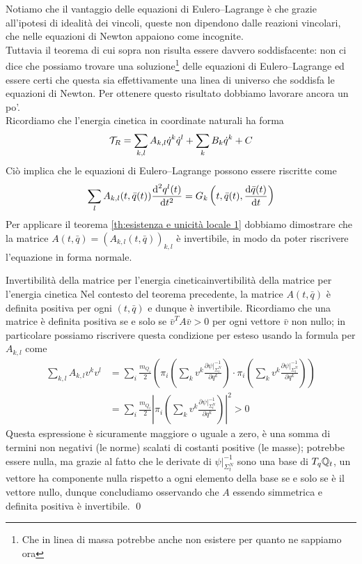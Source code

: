 \documentclass[openany]{book}
\begin{document}
Notiamo che il vantaggio delle equazioni di Eulero--Lagrange è che grazie all'ipotesi di idealità dei vincoli, queste non dipendono dalle reazioni vincolari, che nelle equazioni di Newton appaiono come incognite.\\
Tuttavia il teorema di cui sopra non risulta essere davvero soddisfacente: non ci dice che possiamo trovare una soluzione\footnote{Che in linea di massa potrebbe anche non esistere per quanto ne sappiamo ora} delle equazioni di Eulero--Lagrange ed essere certi che questa sia effettivamente una linea di universo che soddisfa le equazioni di Newton. Per ottenere questo risultato dobbiamo lavorare ancora un po'.\\
Ricordiamo che l'energia cinetica in coordinate naturali ha forma 
\[ \mathcal{T}_R = \sum_{k,l}A_{k,l}\dot q^k \dot q^l + \sum_k B_k \dot q^k + C  \]
Ciò implica che le equazioni di Eulero--Lagrange possono essere riscritte come 
\[ \sum_l A_{k,l}(t,\bar q(t))\frac{\text{d}^2 q^l(t)}{\text{d} t^2} = G_k\left(t, \bar q(t), \frac{\text{d}\bar q(t)}{\text{d} t}\right) \]
Per applicare il teorema \cref{th:esistenza e unicità locale 1} dobbiamo dimostrare che la matrice $A(t,\bar q) = (A_{k,l}(t,\bar q))_{k,l}$ è invertibile, in modo da poter riscrivere l'equazione in forma normale.

\begin{theorem}{Invertibilità della matrice per l'energia cinetica}{invertibilità della matrice per l'energia cinetica}
    Nel contesto del teorema precedente, la matrice $A(t,\bar q)$ è definita positiva per ogni $(t,\bar q)$ e dunque è invertibile.
    \proof 
    Ricordiamo che una matrice è definita positiva se e solo se $\bar v^T A \bar v > 0$ per ogni vettore $\bar v$  non nullo; in particolare possiamo riscrivere questa condizione per esteso usando la formula per $A_{k,l}$ come 
    \begin{align*} \sum_{k,l} A_{k,l} v^k v^l & = \sum_i \frac{m_{Q_i}}{2} \left( \pi_i\left( \sum_k v^k \frac{\partial \psi|_{\Sigma_t^N}^{-1}}{\partial q^k} \right) \cdot \pi_i\left( \sum_k v^k \frac{\partial \psi|_{\Sigma_t^N}^{-1}}{\partial q^k} \right) \right) \\ & = \sum_i \frac{m_{Q_i}}{2} \left| \pi_i\left( \sum_k v^k \frac{\partial \psi|_{\Sigma_t^N}^{-1}}{\partial q^k} \right) \right|^2 > 0 \end{align*}
    Questa espressione è sicuramente maggiore o uguale a zero, è una somma di termini non negativi (le norme) scalati di costanti positive (le masse); potrebbe essere nulla, ma grazie al fatto che le derivate di $\psi|_{\Sigma_t^N}^{-1}$ sono una base di $T_q\mathbb{Q}_t$, un vettore ha componente nulla rispetto a ogni elemento della base se e solo se è il vettore nullo, dunque concludiamo osservando che $A$ essendo simmetrica e definita positiva è invertibile.
    \qed
\end{theorem}
\end{document}
